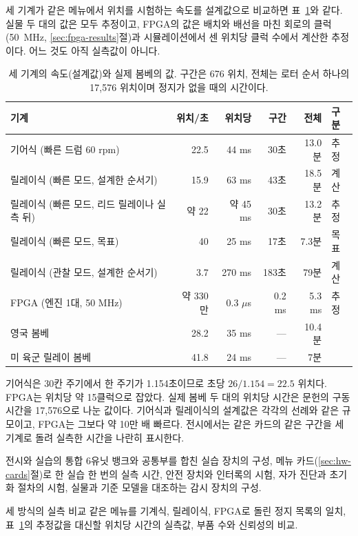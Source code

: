 세 기계가 같은 메뉴에서 위치를 시험하는 속도를 설계값으로 비교하면 표~\ref{tab:hw-three}와 같다. 실물 두 대의
값은 모두 추정이고, FPGA의 값은 배치와 배선을 마친 회로의 클럭(50~MHz, \ref{sec:fpga-results}절)과
시뮬레이션에서 센 위치당 클럭 수에서 계산한 추정이다. 어느 것도 아직 실측값이 아니다.

\begin{table}[ht]
\centering
\caption{세 기계의 속도(설계값)와 실제 봄베의 값. 구간은 676 위치, 전체는 로터 순서 하나의 17,576 위치이며
정지가 없을 때의 시간이다.}
\label{tab:hw-three}
\small
\begin{tabularx}{\linewidth}{>{\raggedright\arraybackslash}X r r r r l}
\toprule
기계 & 위치/초 & 위치당 & 구간 & 전체 & 구분 \\
\midrule
기어식 (빠른 드럼 60 rpm) & 22.5 & 44 ms & 30초 & 13.0분 & 추정 \\
릴레이식 (빠른 모드, 설계한 순서기) & 15.9 & 63 ms & 43초 & 18.5분 & 계산 \\
릴레이식 (빠른 모드, 리드 릴레이나 실측 뒤) & 약 22 & 약 45 ms & 30초 & 13.2분 & 추정 \\
릴레이식 (빠른 모드, 목표) & 40 & 25 ms & 17초 & 7.3분 & 목표 \\
릴레이식 (관찰 모드, 설계한 순서기) & 3.7 & 270 ms & 183초 & 79분 & 계산 \\
FPGA (엔진 1대, 50 MHz) & 약 330만 & 0.3 $\mu$s & 0.2 ms & 5.3 ms & 추정 \\
\midrule
영국 봄베 & 28.2 & 35 ms & --- & 10.4분 & \cite{jackson-bh09,jackson-bh11} \\
미 육군 릴레이 봄베 & 41.8 & 24 ms & --- & 7분 & \cite{dturing2021army} \\
\bottomrule
\end{tabularx}
\end{table}

기어식은 30칸 주기에서 한 주기가 1.154초이므로 초당 $26/1.154 = 22.5$ 위치다. FPGA는 위치당 약 15클럭으로
잡았다. 실제 봄베 두 대의 위치당 시간은 문헌의 구동 시간을 17,576으로 나눈 값이다. 기어식과 릴레이식의
설계값은 각각의 선례와 같은 규모이고, FPGA는 그보다 약 10만 배 빠르다. 전시에서는 같은 카드의 같은 구간을
세 기계로 돌려 실측한 시간을 나란히 표시한다.

\begin{todobox}{전시와 실습의 통합}
6유닛 뱅크와 공통부를 합친 실습 장치의 구성, 메뉴 카드(\ref{sec:hw-cards}절)로 한 실습 한 번의 실측 시간,
안전 장치와 인터록의 시험, 자가 진단과 초기화 절차의 시험, 실물과 기준 모델을 대조하는 감시 장치의 구성.
\end{todobox}

\begin{todobox}{세 방식의 실측 비교}
같은 메뉴를 기계식, 릴레이식, FPGA로 돌린 정지 목록의 일치, 표~\ref{tab:hw-three}의 추정값을 대신할 위치당
시간의 실측값, 부품 수와 신뢰성의 비교.
\end{todobox}
